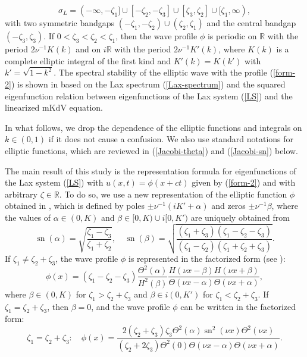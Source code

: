 \documentclass[12pt,reqno]{amsart}
\numberwithin{equation}{section}
\DeclareMathOperator{\sn}{sn}
\begin{document}
\begin{equation}
\label{Lax-spectrum}
\sigma_L = (-\infty,-\zeta_1] \cup [-\zeta_2,-\zeta_3] \cup [\zeta_3,\zeta_2] \cup [\zeta_1,\infty),
\end{equation}
with two symmetric bandgaps $(-\zeta_1,-\zeta_2) \cup (\zeta_2,\zeta_1)$ and the central bandgap $(-\zeta_3,\zeta_3)$. If $0 < \zeta_3 < \zeta_2 < \zeta_1$, then the wave profile $\phi$ is periodic on $\mathbb{R}$ with the period $2\nu^{-1} K(k)$ and on $i \mathbb{R}$ with the period $2 \nu^{-1} K'(k)$,  where $K(k)$ is a complete elliptic integral of the first kind and $K'(k) = K(k')$ with $k' = \sqrt{1-k^2}$. The spectral stability of the elliptic wave with the profile (\ref{form-2}) is shown 
in \cite{DN1} based on the Lax spectrum (\ref{Lax-spectrum}) and the 
squared eigenfunction relation between eigenfunctions of the Lax system (\ref{LS}) 
and the linearized mKdV equation. 


In what follows, we drop the dependence of the elliptic functions and integrals on $k \in (0,1)$ if it does not cause a confusion. We also use standard notations for elliptic functions, which are reviewed in (\ref{Jacobi-theta}) and (\ref{Jacobi-sn}) below. 

The main result of this study is the representation formula for eigenfunctions of the Lax system (\ref{LS}) with $u(x,t) = \phi(x+ct)$ given by (\ref{form-2}) and with arbitrary $\zeta \in \mathbb{R}$. To do so, we use a 
new representation of the elliptic function $\phi$ obtained in \cite{AP25}, which is defined by poles $\pm \nu^{-1} (iK'+\alpha)$ and zeros $\pm \nu^{-1} \beta$, 
where the values of  $\alpha \in (0,K)$ and $\beta \in [0,K) \cup i[0,K')$ are uniquely obtained from 
\begin{equation}
\label{parameters-nu-k-alpha}
\sn(\alpha) = \sqrt{\dfrac{\zeta_1 - \zeta_3}{\zeta_1 + \zeta_2}}, \quad 
\sn(\beta) = \sqrt{\frac{(\zeta_1 + \zeta_3)(\zeta_1 - \zeta_2 - \zeta_3)}{
		(\zeta_1 - \zeta_2) (\zeta_1 + \zeta_2 + \zeta_3)}}.
\end{equation}
If $\zeta_1 \neq \zeta_2 + \zeta_3$, the wave profile $\phi$
is represented in the factorized form (see \cite[Theorem 1]{AP25}):
\begin{equation}
\label{gen-theta}
\phi(x) = (\zeta_1 - \zeta_2 - \zeta_3) \frac{\Theta^2(\alpha)}{H^2(\beta)} \frac{H(\nu x-\beta) H(\nu x + \beta)}{\Theta(\nu x-\alpha) \Theta(\nu x+\alpha)},
\end{equation}
where $\beta \in (0,K)$ for $\zeta_1 > \zeta_2 + \zeta_3$ and $\beta \in i(0,K')$ for $\zeta_1 < \zeta_2 + \zeta_3$. If $\zeta_1 = \zeta_2 + \zeta_3$, then $\beta = 0$, and the wave profile $\phi$ can be written in the factorized form:
\begin{equation}
\label{gen-theta-degenerate}
\zeta_1 = \zeta_2 + \zeta_3 : \quad 
\phi(x) = \frac{2 (\zeta_2 + \zeta_3) \zeta_3 \Theta^2(\alpha) \sn^2(\nu x)  \Theta^2(\nu x)}{(\zeta_2 + 2 \zeta_3) \Theta^2(0) \Theta(\nu x-\alpha) \Theta(\nu x+\alpha)}.
\end{equation}
\end{document}
